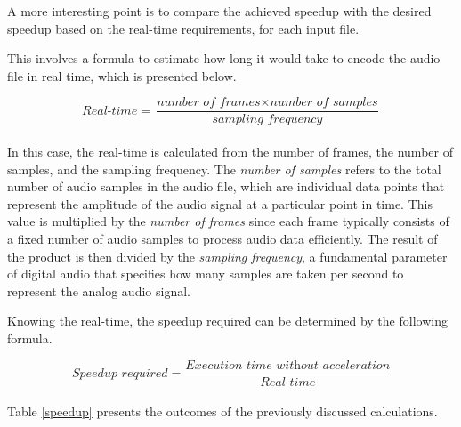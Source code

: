 A more interesting point is to compare the achieved speedup with the desired speedup based on the real-time requirements, for each input file. 

This involves a formula to estimate how long it would take to encode the audio file in real time, which is presented below.

\begin{equation}
    \textit{Real-time} = \frac{\textit{number of frames} \times \textit{number of samples}}{\textit{sampling frequency}} 
\end{equation}\\

In this case, the real-time is calculated from the number of frames, the number of samples, and the sampling frequency.
The \textit{number of samples} refers to the total number of audio samples in the audio file, which are individual data points that represent the amplitude of the audio signal at a particular point in time. This value is multiplied by the \textit{number of frames} since each frame typically consists of a fixed number of audio samples to process audio data efficiently. The result of the product is then divided by the \textit{sampling frequency}, a fundamental parameter of digital audio that specifies how many samples are taken per second to represent the analog audio signal.

Knowing the real-time, the speedup required can be determined by the following formula.

\begin{equation}
    \textit{Speedup required} = \frac{\textit{Execution time without acceleration}}{\textit{Real-time}} 
\end{equation}\\

Table \ref{speedup} presents the outcomes of the previously discussed calculations.

\vspace{1cm}

